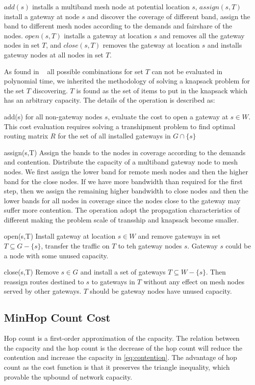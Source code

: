 $add(s)$ installs a multiband mesh node at potential location $s$, $assign(s,T)$ install a gateway at node $s$ and discover the coverage of different band, assign the band to different mesh nodes according to the demands and fairshare of the nodes. $open(s,T)$ installs a gateway at location $s$ and removes all the gateway nodes in set $T$, and $close(s,T)$ removes the gateway at location $s$ and installs gateway nodes at all nodes in set $T$.

As found in ~\cite{robinson2008adding} all possible combinations for set $T$ can not be evaluated in polynomial time, we inherited the methodology of solving a knapsack problem for the set $T$ discovering. $T$ is found as the set of items to put in the knapsack which has an arbitrary capacity.
The details of the operation is described as:

add(s) for all non-gateway nodes $s$, evaluate the cost to open a gateway at $s \in W$. This cost evaluation requires solving a transhipment problem to find optimal routing matrix $R$ for the set of all installed gateways in $G \cap \{s\}$

assign(s,T) Assign the bands to the nodes in coverage according to the demands and contention. Distribute the capacity of a multiband gateway node to mesh nodes. 
We first assign the lower band for remote mesh nodes and then the higher band for the close nodes. If we have more bandwidth than required for the first step, then we assign the remaining higher bandwidth to close nodes and then the lower bands for all nodes in coverage since the nodes close to the gateway may suffer more contention.
The operation adopt the propagation characteristics of different making the problem scale of transship and knapsack become smaller.

 
open(s,T) Install gateway at location $s \in W$ and remove gateways in set $T \subseteq G-\{s\}$, transfer the traffic on $T$ to teh gateway nodes $s$. Gateway $s$ could be a node with some unused capacity.

close(s,T) Remove $s \in G$ and install a set of gateways $T \subseteq W-\{s\}$. Then reassign routes destined to $s$ to gateways in $T$ without any effect on mesh nodes served by other gateways. $T$ should be gateway nodes have unused capacity.
\subsection{MinHop Count Cost}
\label{subsec:hopcount}
Hop count is a first-order approximation of the capacity. The relation between the capacity and the hop count is the decrease of the hop count will reduce the contention and increase the capacity in \ref{eq:contention}.
The advantage of hop count as the cost function is that it preserves the triangle inequality, which provable the upbound of network capacity.




